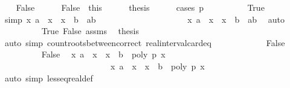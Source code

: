 \begin{isabellebody}
\ \ \isamarkupfalse%
\ False\isanewline
\ \ \ \ \isamarkupfalse%
\ False{\isacharprime}\ {\isacharequal}\ this\isanewline
\ \ \ \ \isamarkupfalse%
\ {\isacharquery}thesis\isanewline
\ \ \ \ \isamarkupfalse%
\ {\isacharparenleft}cases\ {\isachardoublequoteopen}p\ {\isacharequal}\ {}{\isachardoublequoteclose}{\isacharparenright}\isanewline
\ \ \ \ \ \ \isamarkupfalse%
\ True\isanewline
\ \ \ \ \ \ \ \ \isamarkupfalse%
\ {\isacharbrackleft}simp{\isacharbrackright}{\isacharcolon}\ {\isachardoublequoteopen}{\isacharbraceleft}x{\isachardot}\ a\ {\isacharless}\ x\ {\isasymand}\ x\ {\isacharless}\ b{\isacharbraceright}\ {\isacharequal}\ {\isacharbraceleft}a{\isacharless}{\isachardot}{\isachardot}{\isacharless}b{\isacharbraceright}{\isachardoublequoteclose}\isanewline
\ \ \ \ \ \ \ \ \ \ \ \ \ \ \ \ \ \ \ \ \ {\isachardoublequoteopen}{\isacharbraceleft}x{\isachardot}\ a\ {\isacharless}\ x\ {\isasymand}\ x\ {\isasymle}\ b{\isacharbraceright}\ {\isacharequal}\ {\isacharbraceleft}a{\isacharless}{\isachardot}{\isachardot}b{\isacharbraceright}{\isachardoublequoteclose}\ \isamarkupfalse%
\ auto\isanewline
\ \ \ \ \ \ \ \ \isamarkupfalse%
\ True\ False{\isacharprime}\ assms\ \isamarkupfalse%
\ {\isacharquery}thesis\ \isanewline
\ \ \ \ \ \ \ \ \ \ \ \ \isamarkupfalse%
\ {\isacharparenleft}auto\ simp{\isacharcolon}\ count{\isacharunderscore}roots{\isacharunderscore}between{\isacharunderscore}correct\ real{\isacharunderscore}interval{\isacharunderscore}card{\isacharunderscore}eq{\isacharparenright}\isanewline
\ \ \ \ \isamarkupfalse%
\isanewline
\ \ \ \ \ \ \isamarkupfalse%
\ False\isanewline
\ \ \ \ \ \ \ \ \isamarkupfalse%
\ False{\isacharprime}\ \isamarkupfalse%
\ {\isachardoublequoteopen}{\isacharbraceleft}x{\isachardot}\ a\ {\isacharless}\ x\ {\isasymand}\ x\ {\isacharless}\ b\ {\isasymand}\ poly\ p\ x\ {\isacharequal}\ {}{\isacharbraceright}\ {\isacharequal}\ \isanewline
\ \ \ \ \ \ \ \ \ \ \ \ \ \ \ \ \ \ \ \ \ \ \ \ \ \ {\isacharbraceleft}x{\isachardot}\ a\ {\isacharless}\ x\ {\isasymand}\ x\ {\isasymle}\ b\ {\isasymand}\ poly\ p\ x\ {\isacharequal}\ {}{\isacharbraceright}{\isachardoublequoteclose}\isanewline
\ \ \ \ \ \ \ \ \ \ \isamarkupfalse%
\ {\isacharparenleft}auto\ simp{\isacharcolon}\ less{\isacharunderscore}eq{\isacharunderscore}real{\isacharunderscore}def{\isacharparenright}\isanewline

\end{isabellebody}

